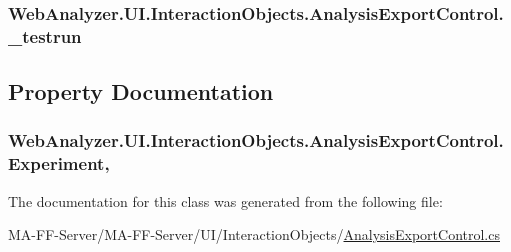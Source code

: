 \subsubsection[{\+\_\+testrun}]{ Web\+Analyzer.\+U\+I.\+Interaction\+Objects.\+Analysis\+Export\+Control.\+\_\+testrun\hspace{0.3cm}{\ttfamily [private]}}\label{class_web_analyzer_1_1_u_i_1_1_interaction_objects_1_1_analysis_export_control_adb1ac5a4139c8bee5b1c694983154936}


\subsection{Property Documentation}
\hypertarget{class_web_analyzer_1_1_u_i_1_1_interaction_objects_1_1_analysis_export_control_a951604e49f2e9dfe33ec3cb1d8fdc4fa}{}
\subsubsection[{Experiment}]{ Web\+Analyzer.\+U\+I.\+Interaction\+Objects.\+Analysis\+Export\+Control.\+Experiment\hspace{0.3cm}{\ttfamily [get]}, {\ttfamily [set]}}\label{class_web_analyzer_1_1_u_i_1_1_interaction_objects_1_1_analysis_export_control_a951604e49f2e9dfe33ec3cb1d8fdc4fa}


The documentation for this class was generated from the following file\+:\begin{DoxyCompactItemize}
\item 
M\+A-\/\+F\+F-\/\+Server/\+M\+A-\/\+F\+F-\/\+Server/\+U\+I/\+Interaction\+Objects/\hyperlink{_analysis_export_control_8cs}{Analysis\+Export\+Control.\+cs}\end{DoxyCompactItemize}
